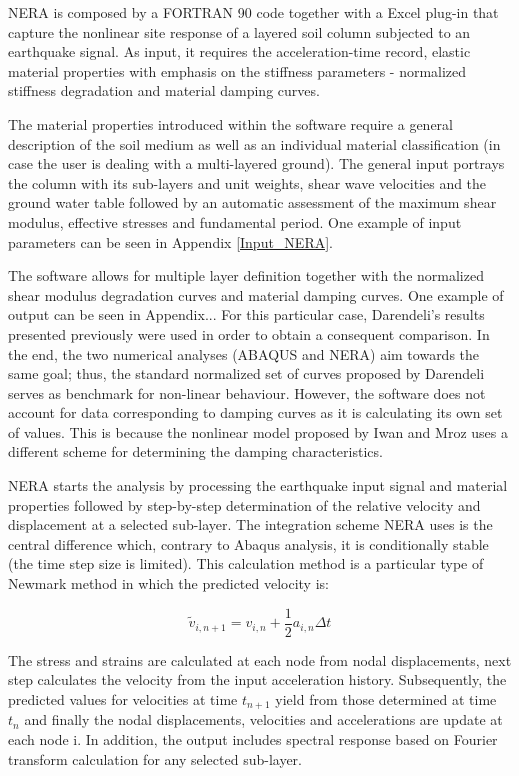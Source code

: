 	NERA is composed by a FORTRAN 90 code together with a Excel plug-in that capture the nonlinear site response of a layered soil column subjected to an earthquake signal. As input, it requires the acceleration-time record, elastic material properties with emphasis on the stiffness parameters - normalized stiffness degradation and material damping curves. 
	
	The material properties introduced within the software require a general description of the soil medium as well as an individual material classification (in case the user is dealing with a multi-layered ground). The general input portrays the column with its sub-layers and unit weights, shear wave velocities and the ground water table followed by an automatic assessment of the maximum shear modulus, effective stresses and fundamental period. One example of input parameters can be seen in Appendix \ref{Input_NERA}.
	
	The software allows for multiple layer definition together with the normalized shear modulus degradation curves and material damping curves. One example of output can be seen in Appendix... For this particular case, Darendeli's results presented previously were used in order to obtain a consequent comparison. In the end, the two numerical analyses (ABAQUS and NERA) aim towards the same goal; thus, the standard normalized set of curves proposed by Darendeli serves as benchmark for non-linear behaviour. However, the software does not account for data corresponding to damping curves as it is calculating its own set of values. This is because the nonlinear model proposed by Iwan and Mroz uses a different scheme for determining the damping characteristics.
	
	NERA starts the analysis by processing the earthquake input signal and material properties followed by step-by-step determination of the relative velocity and displacement at a selected sub-layer. The integration scheme NERA uses is the central difference which, contrary to Abaqus analysis, it is conditionally stable (the time step size is limited). This calculation method is a particular type of Newmark method in which the predicted velocity is:
	
	\begin{equation}
	\tilde{v}_{i,n+1}=v_{i,n}+\frac{1}{2}a_{i,n}\Delta t
	\end{equation}
	
	The stress and strains are calculated at each node from nodal displacements, next step calculates the velocity from the input acceleration history. Subsequently, the predicted values for velocities at time $t_{n+1}$ yield from those determined at time $t_n$ and finally the nodal displacements, velocities and accelerations are update at each node i. In addition, the output includes spectral response based on Fourier transform calculation for any selected sub-layer.
	
